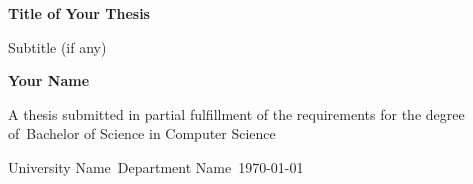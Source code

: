 \begin{titlepage}
    \begin{center}
        \vspace*{1cm}
        
        \Huge
        \textbf{Title of Your Thesis}
        
        \vspace{0.5cm}
        \LARGE
        Subtitle (if any)
        
        \vspace{1.5cm}
        
        \textbf{Your Name}
        
        \vfill
        
        A thesis submitted in partial fulfillment of the requirements for the degree of\
        Bachelor of Science in Computer Science
        
        \vspace{0.8cm}
        
        
        \Large
        University Name\
        Department Name\
        \today
        
    \end{center}
\end{titlepage}
